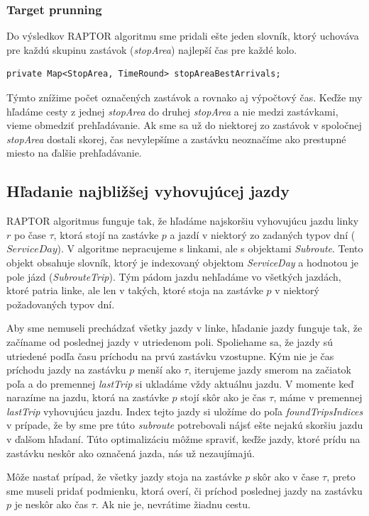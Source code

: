 \subsubsection{Target prunning}
Do výsledkov RAPTOR algoritmu sme pridali ešte jeden slovník, ktorý uchováva pre každú skupinu zastávok (\textit{stopArea}) najlepší čas pre každé kolo. 
\begin{lstlisting}
private Map<StopArea, TimeRound> stopAreaBestArrivals;
\end{lstlisting}
Týmto znížime počet označených zastávok a rovnako aj výpočtový čas. Keďže my hľadáme cesty z jednej \textit{stopArea} do druhej \textit{stopArea} a nie medzi zastávkami, vieme obmedziť prehľadávanie. Ak sme sa už do niektorej zo zastávok v spoločnej \textit{stopArea} dostali skorej, čas nevylepšíme a zastávku neoznačíme ako prestupné miesto na ďalšie prehľadávanie. 

\subsection{Hľadanie najbližšej vyhovujúcej jazdy}
\label{trip-finding}
RAPTOR algoritmus funguje tak, že hľadáme najskoršiu vyhovujúcu jazdu linky $r$ po čase $\tau$, ktorá stojí na zastávke $p$ a jazdí v niektorý zo zadaných typov dní ($ServiceDay$). V algoritme nepracujeme s linkami, ale s objektami \textit{Subroute}. Tento objekt obsahuje slovník, ktorý je indexovaný objektom \textit{ServiceDay} a hodnotou je pole jázd (\textit{SubrouteTrip}). Tým pádom jazdu nehľadáme vo všetkých jazdách, ktoré patria linke, ale len v takých, ktoré stoja na zastávke $p$ v niektorý požadovaných typov dní. 

Aby sme nemuseli prechádzať všetky jazdy v linke, hľadanie jazdy funguje tak, že začíname od poslednej jazdy v utriedenom poli. Spoliehame sa, že jazdy sú utriedené podľa času príchodu na prvú zastávku vzostupne. Kým nie je čas príchodu jazdy na zastávku $p$ menší ako $\tau$, iterujeme jazdy smerom na začiatok poľa a do premennej \textit{lastTrip} si ukladáme vždy aktuálnu jazdu. V momente keď narazíme na jazdu, ktorá na zastávke $p$ stojí skôr ako je čas $\tau$, máme v premennej \textit{lastTrip} vyhovujúcu jazdu. Index tejto jazdy si uložíme do poľa \textit{foundTripsIndices} v prípade, že by sme pre túto \textit{subroute} potrebovali nájsť ešte nejakú skoršiu jazdu v ďalšom hľadaní. Túto optimalizáciu môžme spraviť, keďže jazdy, ktoré prídu na zastávku neskôr ako označená jazda, nás už nezaujímajú.  

Môže nastať prípad, že všetky jazdy stoja na zastávke $p$ skôr ako v čase $\tau$, preto sme museli pridať podmienku, ktorá overí, či príchod poslednej jazdy na zastávku $p$ je neskôr ako čas $\tau$. Ak nie je, nevrátime žiadnu cestu. 

